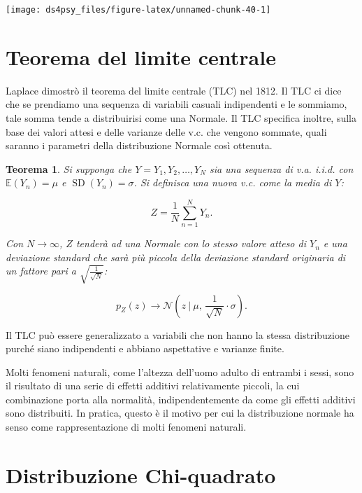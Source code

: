 \documentclass[
  11pt,
]{krantz}
\newcommand{\E}{\mathbb{E}} %
\DeclareMathOperator{\SD}{SD} %
\newtheorem{theorem}{Teorema}[chapter]
\theoremstyle{definition}
\theoremstyle{definition}
\theoremstyle{definition}
\theoremstyle{definition}
\theoremstyle{remark}
\begin{document}
\begin{center}\texttt{[image: ds4psy\_files/figure-latex/unnamed-chunk-40-1]} \end{center}

\hypertarget{teorema-del-limite-centrale}{%
\section{Teorema del limite centrale}\label{teorema-del-limite-centrale}}

Laplace dimostrò il teorema del limite centrale (TLC) nel 1812. Il TLC ci dice che se prendiamo una sequenza di variabili casuali indipendenti e le sommiamo, tale somma tende a distribuirisi come una Normale. Il TLC specifica inoltre, sulla base dei valori attesi e delle varianze delle v.c. che vengono sommate, quali saranno i parametri della distribuzione Normale così ottenuta.

\begin{theorem}
Si supponga che \(Y = Y_1, Y_2, \ldots, Y_N\) sia una sequenza di v.a. i.i.d. con \(\E(Y_n) = \mu\) e \(\SD(Y_n) = \sigma\). Si definisca una nuova v.c. come la media di \(Y\):

\[
Z = \frac{1}{N} \sum_{n=1}^N Y_n.
\]

Con \(N \rightarrow \infty\), \(Z\) tenderà ad una Normale con lo stesso valore atteso di \(Y_n\) e una deviazione standard che sarà più piccola della deviazione standard originaria di un fattore pari a \(\sqrt{\frac{1}{\sqrt{N}}}\):

\begin{equation}
p_Z(z) \rightarrow \mathcal{N}\left(z \ \Bigg| \ \mu, \, \frac{1}{\sqrt{N}} \cdot \sigma \right).
\end{equation}
\end{theorem}

Il TLC può essere generalizzato a variabili che non hanno la stessa distribuzione purché siano indipendenti e abbiano aspettative e varianze finite.

Molti fenomeni naturali, come l'altezza dell'uomo adulto di entrambi i sessi, sono il risultato di una serie di effetti additivi relativamente piccoli, la cui combinazione porta alla normalità, indipendentemente da come gli effetti additivi sono distribuiti. In pratica, questo è il motivo per cui la distribuzione normale ha senso come rappresentazione di molti fenomeni naturali.

\hypertarget{distribuzione-chi-quadrato}{%
\section{Distribuzione Chi-quadrato}\label{distribuzione-chi-quadrato}}
\end{document}
